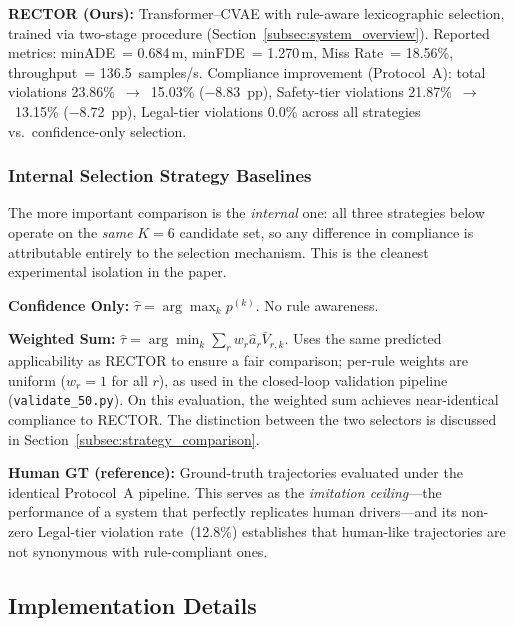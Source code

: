 \textbf{RECTOR (Ours):}  Transformer--CVAE with rule-aware lexicographic selection, trained via two-stage procedure (Section~\ref{subsec:system_overview}).  Reported metrics: minADE~= 0.684\,m, minFDE~= 1.270\,m, Miss Rate~= 18.56\%, throughput~= 136.5~samples/s.  Compliance improvement (Protocol~A): total violations 23.86\%~$\rightarrow$~15.03\% ($-$8.83~pp), Safety-tier violations 21.87\%~$\rightarrow$~13.15\% ($-$8.72~pp), Legal-tier violations 0.0\% across all strategies vs.\ confidence-only selection.

\subsubsection{Internal Selection Strategy Baselines}

The more important comparison is the \emph{internal} one: all three strategies below operate on the \emph{same} $K{=}6$ candidate set, so any difference in compliance is attributable entirely to the selection mechanism. This is the cleanest experimental isolation in the paper.

\textbf{Confidence Only:}  $\hat{\tau} = \arg\max_k p^{(k)}$.  No rule awareness.

\textbf{Weighted Sum:}  $\hat{\tau} = \arg\min_k \sum_r w_r \hat{a}_r \bar{V}_{r,k}$.  Uses the same predicted applicability as RECTOR to ensure a fair comparison; per-rule weights are uniform ($w_r{=}1$ for all $r$), as used in the closed-loop validation pipeline (\texttt{validate\_50.py}).  On this evaluation, the weighted sum achieves near-identical compliance to RECTOR.  The distinction between the two selectors is discussed in Section~\ref{subsec:strategy_comparison}.

\textbf{Human GT (reference):}  Ground-truth trajectories evaluated under the identical Protocol~A pipeline.  This serves as the \emph{imitation ceiling}---the performance of a system that perfectly replicates human drivers---and its non-zero Legal-tier violation rate~(12.8\%) establishes that human-like trajectories are not synonymous with rule-compliant ones.

\subsection{Implementation Details}
\label{subsec:implementation}

